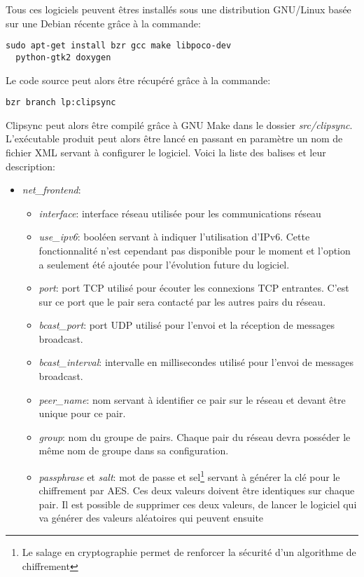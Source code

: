 Tous ces logiciels peuvent êtres installés sous une distribution GNU/Linux
basée sur une Debian récente grâce à la commande:
\begin{verbatim}
sudo apt-get install bzr gcc make libpoco-dev
  python-gtk2 doxygen
\end{verbatim}
Le code source peut alors être récupéré grâce à la commande:
\begin{verbatim}
bzr branch lp:clipsync
\end{verbatim}
Clipsync peut alors être compilé grâce à GNU Make dans le dossier
\emph{src/clipsync}.
L'exécutable produit peut alors être lancé en passant en paramètre un nom
de fichier XML servant à configurer le logiciel. Voici la liste des balises
et leur description:
\begin{itemize}
\item \emph{net\_frontend}:
  \begin{itemize}
  \item \emph{interface}: interface réseau utilisée pour les communications
    réseau
  \item \emph{use\_ipv6}: booléen servant à indiquer l'utilisation d'IPv6.
    Cette fonctionnalité n'est cependant pas disponible pour le moment et
    l'option a seulement été ajoutée pour l'évolution future du logiciel.
  \item \emph{port}: port TCP utilisé pour écouter les connexions TCP
    entrantes. C'est sur ce port que le pair sera contacté par les autres
    pairs du réseau.
  \item \emph{bcast\_port}: port UDP utilisé pour l'envoi et la réception de
    messages broadcast.
  \item \emph{bcast\_interval}: intervalle en millisecondes utilisé pour
    l'envoi de messages broadcast.
  \item \emph{peer\_name}: nom servant à identifier ce pair sur le réseau et
    devant être unique pour ce pair.
  \item \emph{group}: nom du groupe de pairs. Chaque pair du réseau devra
    posséder le même nom de groupe dans sa configuration.
  \item \emph{passphrase} et \emph{salt}: mot de passe et sel\footnote{Le
      salage en cryptographie permet de renforcer la sécurité d'un algorithme
      de chiffrement\cite{schneier-crypto}} servant à générer la clé pour le
    chiffrement par AES. Ces deux valeurs doivent être identiques sur chaque
    pair. Il est possible de supprimer ces deux valeurs, de lancer le
    logiciel qui va générer des valeurs aléatoires qui peuvent ensuite

\end{itemize}
\end{itemize}
